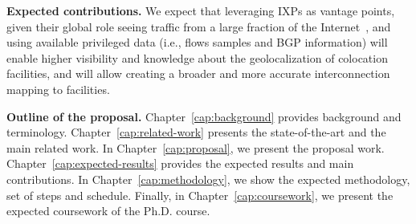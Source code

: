 	\textbf{Expected contributions.} We expect that leveraging IXPs as vantage points, given their global role seeing traffic from a large fraction of the Internet~\cite{Chatzis:2013:BUL:2504730.2504746}, and using available privileged data (i.e., flows samples and BGP information) will enable higher visibility and knowledge about the geolocalization of colocation facilities, and will allow creating a broader and more accurate interconnection mapping to facilities. 


	\textbf{Outline of the proposal.} Chapter~\ref{cap:background} provides background and terminology. Chapter~\ref{cap:related-work} presents the state-of-the-art and the main related work. In Chapter~\ref{cap:proposal}, we present the proposal work. Chapter~\ref{cap:expected-results} provides the expected results and main contributions. In Chapter~\ref{cap:methodology}, we show the expected methodology, set of steps and schedule. Finally, in Chapter~\ref{cap:coursework}, we present the expected coursework of the Ph.D. course.


